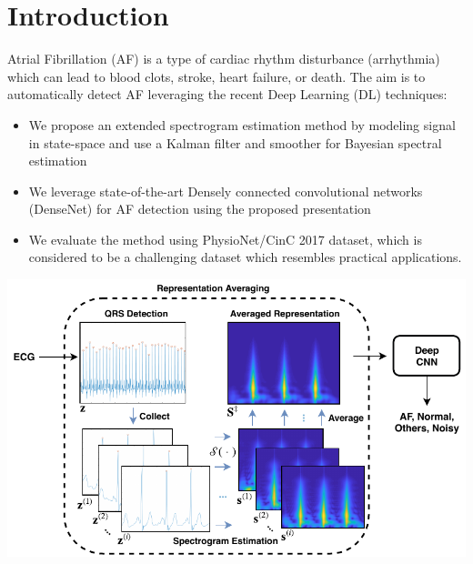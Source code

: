 \documentclass[portrait,a0,final]{a0poster} %
\begin{document}

\vspace{0.04\linewidth}

\centering



\small %


\begin{minipage}{0.98\linewidth}




\begin{minipage}[t]{0.47\linewidth}
\setlength{\parindent}{10mm} %


\section*{Introduction}
\Large
Atrial Fibrillation (AF) is a type of cardiac rhythm disturbance (arrhythmia) which can lead to blood clots, stroke, heart failure, or death. The aim is to automatically detect AF leveraging the recent Deep Learning (DL) techniques:
\vspace{10mm}
\begin{itemize}
	\item We propose an extended spectrogram estimation method by modeling signal in state-space and use a Kalman filter and smoother for Bayesian spectral estimation
	\item We leverage state-of-the-art Densely connected convolutional networks (DenseNet) \cite{huang2017densely} for AF detection using the proposed presentation
	\item We evaluate the method using PhysioNet/CinC 2017 dataset, which is considered to be a challenging dataset which resembles practical applications.
\end{itemize}
\begin{minipage}[c]{\linewidth}
	\centering
	\includegraphics[scale=2]{figures/pre-processing}
\end{minipage}



\end{minipage}
\end{minipage}
\end{document}
